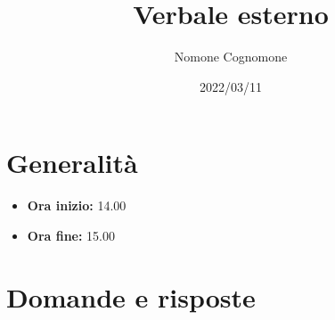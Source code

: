 \documentclass{classes/base}
\title{Verbale esterno}
\date{2022/03/11}
\author{Nomone Cognomone}
\renewcommand{\maketitle}{
    
}
\begin{document}
    \maketitle

    \section*{Generalità}
    \begin{itemize}
        \item \textbf{Ora inizio:} 14.00
        \item \textbf{Ora fine:} 15.00
    \end{itemize}

    \section*{Domande e risposte}
\end{document}

